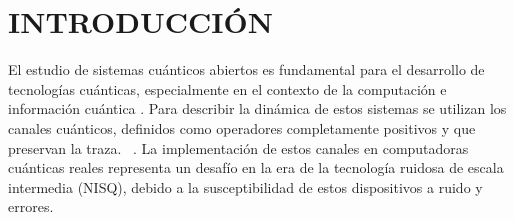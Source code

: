 \documentclass[letterpaper,12pt]{thesisECFM}
\theoremstyle{plain}
\theoremstyle{definition}
\theoremstyle{definition}
\theoremstyle{remark}
\newcommand{\1}{\mathbb{1}}
\begin{document}
\chapter*{INTRODUCCIÓN} %
El estudio de sistemas cuánticos abiertos es fundamental para el desarrollo de
tecnologías cuánticas, especialmente en el contexto de la computación e
información cuántica \cite{nielsen_chuang_2011, schlosshauer2007decoherence}.
Para describir la dinámica de estos sistemas se utilizan los canales cuánticos, definidos como operadores completamente positivos y que preservan la traza.  ~\cite{Choi2024}. La implementación de estos canales en computadoras cuánticas reales representa un desafío en la era de la tecnología ruidosa de escala intermedia (NISQ), debido a la susceptibilidad de estos dispositivos a ruido y errores. 
\end{document}
